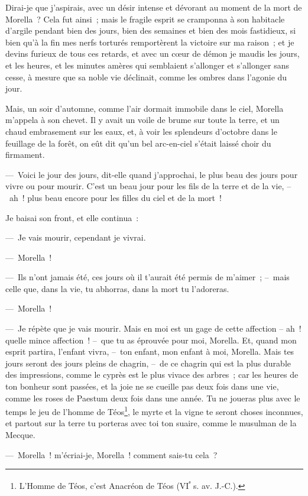 \documentclass[french,twoside]{book} %
\begin{document}
Dirai-je que j’aspirais, avec un désir intense et dévorant au moment de la mort de Morella ? Cela fut ainsi ; mais le fragile esprit se cramponna à son habitacle d’argile pendant bien des jours, bien des semaines et bien des mois fastidieux, si bien qu’à la fin mes nerfs torturés remportèrent la victoire sur ma raison ; et je devins furieux de tous ces retards, et avec un cœur de démon je maudis les jours, et les heures, et les minutes amères qui semblaient s’allonger et s’allonger sans cesse, à mesure que sa noble vie déclinait, comme les ombres dans l’agonie du jour.\par
Mais, un soir d’automne, comme l’air dormait immobile dans le ciel, Morella m’appela à son chevet. Il y avait un voile de brume sur toute la terre, et un chaud embrasement sur les eaux, et, à voir les splendeurs d’octobre dans le feuillage de la forêt, on eût dit qu’un bel arc-en-ciel s’était laissé choir du firmament.\par
— Voici le jour des jours, dit-elle quand j’approchai, le plus beau des jours pour vivre ou pour mourir. C’est un beau jour pour les fils de la terre et de la vie, – ah ! plus beau encore pour les filles du ciel et de la mort !\par
Je baisai son front, et elle continua :\par
— Je vais mourir, cependant je vivrai.\par
— Morella !\par
— Ils n’ont jamais été, ces jours où il t’aurait été permis de m’aimer ; – mais celle que, dans la vie, tu abhorras, dans la mort tu l’adoreras.\par
— Morella !\par
— Je répète que je vais mourir. Mais en moi est un gage de cette affection – ah ! quelle mince affection ! – que tu as éprouvée pour moi, Morella. Et, quand mon esprit partira, l’enfant vivra, – ton enfant, mon enfant à moi, Morella. Mais tes jours seront des jours pleins de chagrin, – de ce chagrin qui est la plus durable des impressions, comme le cyprès est le plus vivace des arbres ; car les heures de ton bonheur sont passées, et la joie ne se cueille pas deux fois dans une vie, comme les roses de Paestum deux fois dans une année. Tu ne joueras plus avec le temps le jeu de l’homme de Téos\footnote{L’Homme de Téos, c’est Anacréon de Téos (VI\textsuperscript{ᵉ} s. av. J.-C.).}, le myrte et la vigne te seront choses inconnues, et partout sur la terre tu porteras avec toi ton suaire, comme le musulman de la Mecque.\par
— Morella ! m’écriai-je, Morella ! comment sais-tu cela ?\par
\end{document}
